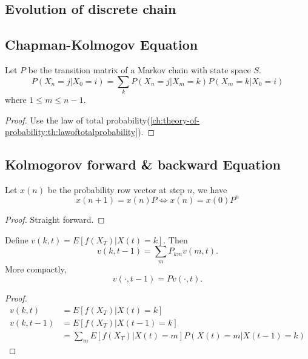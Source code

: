 \begin{refsection}
\section{Evolution of discrete chain}
\subsection{Chapman-Kolmogov Equation}
\begin{lemma}\label{ch:markov-chains:th:Chapman-KolmogovEquation}
Let $P$ be the transition matrix of a Markov chain with state space $S$.
$$P(X_n = j| X_0=i) = \sum_k P(X_n=j|X_m=k)P(X_m=k|X_0=i)$$
where $1\leq m \leq n-1$.	
\end{lemma}
\begin{proof}
Use the law of total probability(\autoref{ch:theory-of-probability:th:lawoftotalprobability}).
\end{proof}

\begin{corollary}
	
\end{corollary}



\subsection{Kolmogorov forward \& backward  Equation}

\begin{lemma}
Let $x(n)$ be the probability row vector at step $n$, we have 
$$x(n+1)=x(n)P \Leftrightarrow x(n)=x(0)P^n$$
\end{lemma}
\begin{proof}
Straight forward.
\end{proof}


\begin{lemma}\label{ch:markov-chains:th:KolmogorovbackwardequationDiscreteTimeMarkovChain}
Define $v(k,t) = E[f(X_T)|X(t) = k]$. Then
$$v(k,t-1) =\sum_m P_{km}v(m,t).$$
More compactly,
$$v(\cdot,t-1) = Pv(\cdot,t).$$	
\end{lemma}
\begin{proof}
\begin{align*}
v(k,t) &= E[f(X_T)|X(t) = k] \\
v(k,t-1) &=E[f(X_T)|X(t-1) = k] \\
&= \sum_{m}E[f(X_T)|X(t) = m] P(X(t)=m|X(t-1)=k) 
\end{align*}
\end{proof}


\end{refsection}
